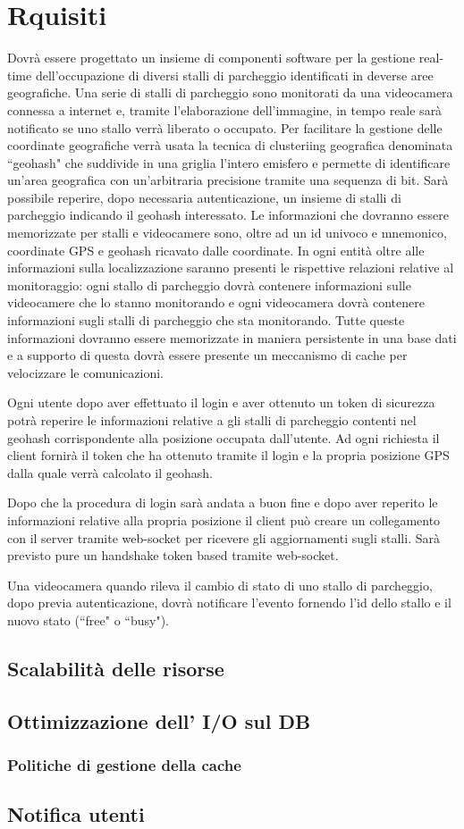 \chapter{Rquisiti}
Dovrà essere progettato un insieme di componenti software per la gestione real-time dell'occupazione di diversi stalli di parcheggio identificati in deverse aree geografiche.
Una serie di stalli di parcheggio sono monitorati da una videocamera connessa a internet e, tramite l'elaborazione dell'immagine, in tempo reale sarà notificato se uno stallo verrà liberato o occupato. Per facilitare la gestione  delle coordinate geografiche verrà usata la tecnica di clusteriing geografica denominata ``geohash" che suddivide in una griglia l'intero emisfero e permette di identificare un'area geografica con un'arbitraria precisione tramite una sequenza di bit. Sarà possibile reperire, dopo necessaria autenticazione, un insieme di stalli di parcheggio indicando il geohash interessato. Le informazioni che dovranno essere memorizzate per stalli e videocamere sono, oltre ad un id univoco e mnemonico, coordinate GPS e geohash ricavato dalle coordinate. In ogni entità oltre alle informazioni sulla localizzazione saranno presenti le rispettive relazioni relative al monitoraggio: ogni stallo di parcheggio dovrà contenere informazioni sulle videocamere che lo stanno monitorando e ogni videocamera dovrà contenere informazioni sugli stalli di parcheggio che sta monitorando.
Tutte queste informazioni dovranno essere memorizzate in maniera persistente in una base dati e a supporto di questa dovrà essere presente un meccanismo di cache per velocizzare le comunicazioni.

Ogni utente dopo aver effettuato il login e aver ottenuto un token di sicurezza potrà reperire le informazioni relative a gli stalli di parcheggio contenti nel geohash corrispondente alla posizione occupata dall'utente. Ad ogni richiesta il client fornirà il token che ha ottenuto tramite il login e la propria posizione GPS dalla quale verrà calcolato il geohash.

Dopo che la procedura di login sarà andata a buon fine e dopo aver reperito le informazioni relative alla propria posizione il client può creare un collegamento con il server tramite web-socket per ricevere gli aggiornamenti sugli stalli. Sarà previsto pure un handshake token based tramite web-socket.

Una videocamera quando rileva il cambio di stato di uno stallo di parcheggio, dopo previa autenticazione, dovrà notificare l'evento fornendo l'id dello stallo e il nuovo stato (``free" o ``busy").



\section{Scalabilità delle risorse}

\section{Ottimizzazione dell' I/O sul DB}

\subsection{Politiche di gestione della cache}

\section{Notifica utenti} 